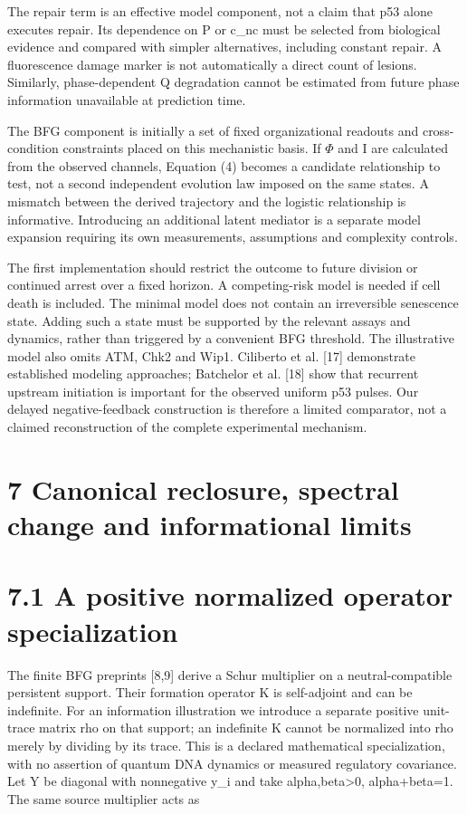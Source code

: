 \documentclass[11pt,a4paper]{article}
\begin{document}
The repair term is an effective model component, not a claim that p53 alone executes repair. Its dependence on P or c\_nc must be selected from biological evidence and compared with simpler alternatives, including constant repair. A fluorescence damage marker is not automatically a direct count of lesions. Similarly, phase-dependent Q degradation cannot be estimated from future phase information unavailable at prediction time.

The BFG component is initially a set of fixed organizational readouts and cross-condition constraints placed on this mechanistic basis. If $\Phi$ and I are calculated from the observed channels, Equation (4) becomes a candidate relationship to test, not a second independent evolution law imposed on the same states. A mismatch between the derived trajectory and the logistic relationship is informative. Introducing an additional latent mediator is a separate model expansion requiring its own measurements, assumptions and complexity controls.

The first implementation should restrict the outcome to future division or continued arrest over a fixed horizon. A competing-risk model is needed if cell death is included. The minimal model does not contain an irreversible senescence state. Adding such a state must be supported by the relevant assays and dynamics, rather than triggered by a convenient BFG threshold. The illustrative model also omits ATM, Chk2 and Wip1. Ciliberto et al. [17] demonstrate established modeling approaches; Batchelor et al. [18] show that recurrent upstream initiation is important for the observed uniform p53 pulses. Our delayed negative-feedback construction is therefore a limited comparator, not a claimed reconstruction of the complete experimental mechanism.

\section*{7 Canonical reclosure, spectral change and informational limits}
\section*{7.1 A positive normalized operator specialization}
The finite BFG preprints [8,9] derive a Schur multiplier on a neutral-compatible persistent support. Their formation operator K is self-adjoint and can be indefinite. For an information illustration we introduce a separate positive unit-trace matrix rho on that support; an indefinite K cannot be normalized into rho merely by dividing by its trace. This is a declared mathematical specialization, with no assertion of quantum DNA dynamics or measured regulatory covariance. Let Y be diagonal with nonnegative y\_i and take alpha,beta>0, alpha+beta=1. The same source multiplier acts as
\end{document}
